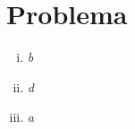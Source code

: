 \section*{Problema}

\begin{enumerate}[i)]
	\item \textit{b}
	\item \textit{d}
	\item \textit{a}
\end{enumerate}






